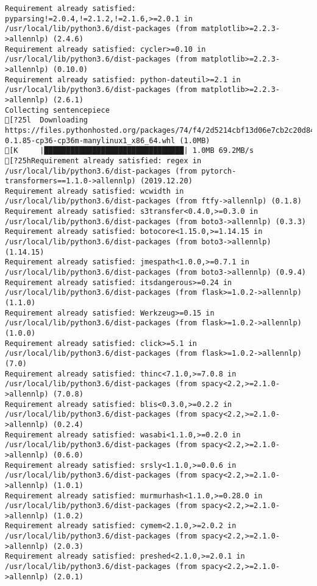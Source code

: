 \documentclass[
]{article}
\begin{document}
\begin{verbatim}
Requirement already satisfied: pyparsing!=2.0.4,!=2.1.2,!=2.1.6,>=2.0.1 in /usr/local/lib/python3.6/dist-packages (from matplotlib>=2.2.3->allennlp) (2.4.6)
Requirement already satisfied: cycler>=0.10 in /usr/local/lib/python3.6/dist-packages (from matplotlib>=2.2.3->allennlp) (0.10.0)
Requirement already satisfied: python-dateutil>=2.1 in /usr/local/lib/python3.6/dist-packages (from matplotlib>=2.2.3->allennlp) (2.6.1)
Collecting sentencepiece
[?25l  Downloading https://files.pythonhosted.org/packages/74/f4/2d5214cbf13d06e7cb2c20d84115ca25b53ea76fa1f0ade0e3c9749de214/sentencepiece-0.1.85-cp36-cp36m-manylinux1_x86_64.whl (1.0MB)
[K     |████████████████████████████████| 1.0MB 69.2MB/s 
[?25hRequirement already satisfied: regex in /usr/local/lib/python3.6/dist-packages (from pytorch-transformers==1.1.0->allennlp) (2019.12.20)
Requirement already satisfied: wcwidth in /usr/local/lib/python3.6/dist-packages (from ftfy->allennlp) (0.1.8)
Requirement already satisfied: s3transfer<0.4.0,>=0.3.0 in /usr/local/lib/python3.6/dist-packages (from boto3->allennlp) (0.3.3)
Requirement already satisfied: botocore<1.15.0,>=1.14.15 in /usr/local/lib/python3.6/dist-packages (from boto3->allennlp) (1.14.15)
Requirement already satisfied: jmespath<1.0.0,>=0.7.1 in /usr/local/lib/python3.6/dist-packages (from boto3->allennlp) (0.9.4)
Requirement already satisfied: itsdangerous>=0.24 in /usr/local/lib/python3.6/dist-packages (from flask>=1.0.2->allennlp) (1.1.0)
Requirement already satisfied: Werkzeug>=0.15 in /usr/local/lib/python3.6/dist-packages (from flask>=1.0.2->allennlp) (1.0.0)
Requirement already satisfied: click>=5.1 in /usr/local/lib/python3.6/dist-packages (from flask>=1.0.2->allennlp) (7.0)
Requirement already satisfied: thinc<7.1.0,>=7.0.8 in /usr/local/lib/python3.6/dist-packages (from spacy<2.2,>=2.1.0->allennlp) (7.0.8)
Requirement already satisfied: blis<0.3.0,>=0.2.2 in /usr/local/lib/python3.6/dist-packages (from spacy<2.2,>=2.1.0->allennlp) (0.2.4)
Requirement already satisfied: wasabi<1.1.0,>=0.2.0 in /usr/local/lib/python3.6/dist-packages (from spacy<2.2,>=2.1.0->allennlp) (0.6.0)
Requirement already satisfied: srsly<1.1.0,>=0.0.6 in /usr/local/lib/python3.6/dist-packages (from spacy<2.2,>=2.1.0->allennlp) (1.0.1)
Requirement already satisfied: murmurhash<1.1.0,>=0.28.0 in /usr/local/lib/python3.6/dist-packages (from spacy<2.2,>=2.1.0->allennlp) (1.0.2)
Requirement already satisfied: cymem<2.1.0,>=2.0.2 in /usr/local/lib/python3.6/dist-packages (from spacy<2.2,>=2.1.0->allennlp) (2.0.3)
Requirement already satisfied: preshed<2.1.0,>=2.0.1 in /usr/local/lib/python3.6/dist-packages (from spacy<2.2,>=2.1.0->allennlp) (2.0.1)

\end{verbatim}
\end{document}
